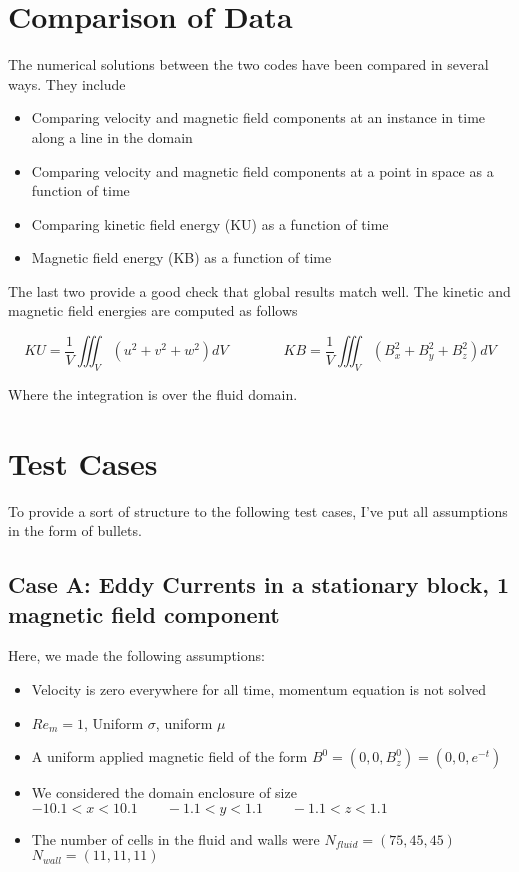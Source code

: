 \documentclass[11pt]{article}
\begin{document}
\section{Comparison of Data}

The numerical solutions between the two codes have been compared in several ways. They include 

\begin{itemize}
\item Comparing velocity and magnetic field components at an instance in time along a line in the domain
\item Comparing velocity and magnetic field components at a point in space as a function of time
\item Comparing kinetic field energy (KU) as a function of time
\item Magnetic field energy (KB) as a function of time
\end{itemize}

The last two provide a good check that global results match well. The kinetic and magnetic field energies are computed as follows

\begin{equation}
	KU = \frac{1}{V} \iiint_{V} (u^2+v^2+w^2) dV
	\qquad \qquad
	KB = \frac{1}{V} \iiint_{V} (B_x^2+B_y^2+B_z^2) dV
\end{equation}

Where the integration is over the fluid domain.

\section{Test Cases}
To provide a sort of structure to the following test cases, I've put all assumptions in the form of bullets.

\subsection{Case A: Eddy Currents in a stationary block, 1 magnetic field component}
Here, we made the following assumptions:

\begin{itemize}
\item Velocity is zero everywhere for all time, momentum equation is not solved
\item $Re_m = 1$, Uniform $\sigma$, uniform $\mu$
\item A uniform applied magnetic field of the form $B^0 = (0,0,B_z^0) = (0,0,e^{-t})$
\item We considered the domain enclosure of size $-10.1 < x < 10.1 \qquad -1.1 < y < 1.1 \qquad -1.1 < z < 1.1$
\item The number of cells in the fluid and walls were $N_{fluid} = (75,45,45)$ \qquad $N_{wall} = (11,11,11)$
\end{itemize}
\end{document}
